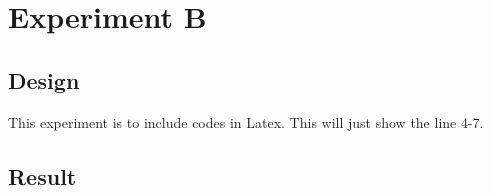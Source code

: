 \section{Experiment B}

\subsection{Design}
This experiment is to include codes in Latex. This will just show the line 4-7.

\subsection{Result}


